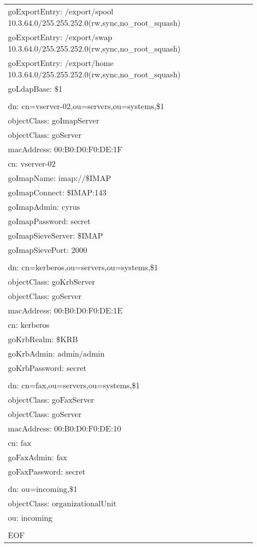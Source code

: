 \begin{center}
\begin{longtable}{|l|}
goExportEntry: /export/spool 10.3.64.0/255.255.252.0(rw,sync,no\_root\_squash)\\
goExportEntry: /export/swap 10.3.64.0/255.255.252.0(rw,sync,no\_root\_squash)\\
goExportEntry: /export/home 10.3.64.0/255.255.252.0(rw,sync,no\_root\_squash)\\
goLdapBase: \$1\\
\\
dn: cn=vserver-02,ou=servers,ou=systems,\$1\\
objectClass: goImapServer\\
objectClass: goServer\\
macAddress: 00:B0:D0:F0:DE:1F\\
cn: vserver-02\\
goImapName: imap://\$IMAP\\
goImapConnect: {\$IMAP:143}\\
goImapAdmin: cyrus\\
goImapPassword: secret\\
goImapSieveServer: \$IMAP\\
goImapSievePort: 2000\\
\\
dn: cn=kerberos,ou=servers,ou=systems,\$1\\
objectClass: goKrbServer\\
objectClass: goServer\\
macAddress: 00:B0:D0:F0:DE:1E\\
cn: kerberos\\
goKrbRealm: \$KRB\\
goKrbAdmin: admin/admin\\
goKrbPassword: secret\\
\\
dn: cn=fax,ou=servers,ou=systems,\$1\\
objectClass: goFaxServer\\
objectClass: goServer\\
macAddress: 00:B0:D0:F0:DE:10\\
cn: fax\\
goFaxAdmin: fax\\
goFaxPassword: secret\\
\\
dn: ou=incoming,\$1\\
objectClass: organizationalUnit\\
ou: incoming\\
\\
EOF\\
\end{longtable}
\end{center}


